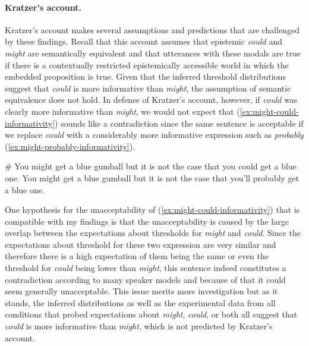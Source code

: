 \paragraph{Kratzer's account.} Kratzer's account makes several assumptions and predictions that are challenged by these findings. Recall that this account 
assumes that epistemic \textit{could} and
\textit{might} are semantically equivalent and that utterances with these modals are true if there is a contextually restricted epistemically accessible
world in which the embedded proposition is true. Given that the inferred threshold distributions suggest that \textit{could} is more informative than \textit{might},
the assumption of semantic equivalence does not hold. In defense of Kratzer's account, however, if \textit{could} was clearly more informative than \textit{might},
we would not expect that (\ref{ex:might-could-informativity}) sounds like a contradiction since the same sentence is acceptable if we replace \textit{could} with
a considerably more informative expression such as \textit{probably} (\ref{ex:might-probably-informativity}).


\begin{exe}
\ex \label{ex:might-could-informativity} \# You might get a blue gumball but it is not the case that you could get a blue one.
\ex \label{ex:might-probably-informativity} You might get a blue gumball but it is not the case that you'll probably get a blue one.
\end{exe}

\noindent One hypothesis for the unacceptability of (\ref{ex:might-could-informativity}) that is compatible with my findings is
that the unacceptability is caused by the large overlap between the expectations about thresholds for \textit{might} and \textit{could}. 
Since the expectations about threshold for these two expression are very similar and therefore there is a 
high expectation of them being the same or even the threshold for \textit{could} being lower than \textit{might}, this sentence
indeed constitutes a contradiction according to many speaker models and  because of that it could seem generally unacceptable.
This issue merits more investigation but as it stands,  the inferred distributions as well as the experimental data from all conditions
that probed expectations about \textit{might}, \textit{could}, or both all suggest that \textit{could} is more informative than \textit{might}, which is not
predicted by Kratzer's account.

